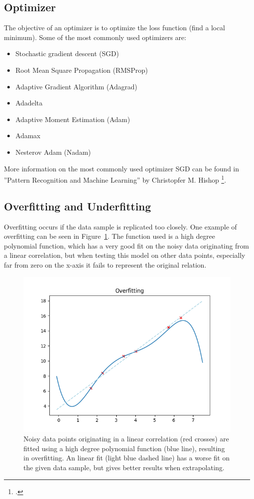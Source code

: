 \subsection{Optimizer}
The objective of an optimizer is to optimize the loss function (find a local minimum). Some of the most commonly used optimizers are:

\begin{itemize}
	\item Stochastic gradient descent (SGD)
	\item Root Mean Square Propagation (RMSProp)
	\item Adaptive Gradient Algorithm (Adagrad)
	\item Adadelta
	\item Adaptive Moment Estimation (Adam)
	\item Adamax
	\item Nesterov Adam (Nadam)
\end{itemize}

More information on the most commonly used optimizer SGD can be found in ''Pattern Recognition and Machine Learning'' by Christopfer M. Hishop \footcite[page 144 and 240]{Bishop_Pattern_Recognition_and_Machine_Learning}.


\subsection{Overfitting and Underfitting}
Overfitting occurs if the data sample is replicated too closely. One example of overfitting can be seen in Figure~\ref{pic:methodology_neuralNetwork_overfitting}. The function used is a high degree polynomial function, which has a very good fit on the noisy data originating from a linear correlation, but when testing this model on other data points, especially far from zero on the x-axis it fails to represent the original relation.

\begin{figure}[h!]
	\centering
	\includegraphics[width=4.5in]{img/methodology_neuralNetwork_overfitting.png}
	\caption{Noisy data points originating in a linear correlation (red crosses) are fitted using a high degree polynomial function (blue line), resulting in overfitting. An linear fit (light blue dashed line) has a worse fit on the given data sample, but gives better results when extrapolating.}
	\label{pic:methodology_neuralNetwork_overfitting}
\end{figure}

